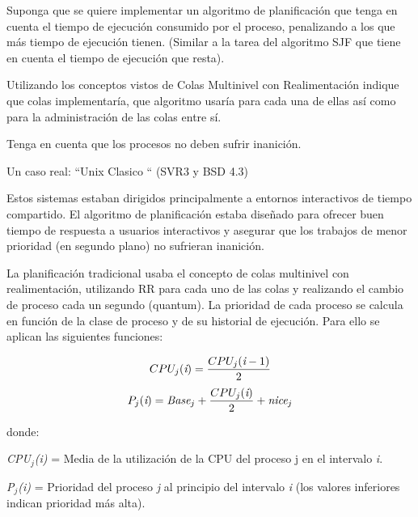 \begin{questions}
\hspace{20pt} Suponga que se quiere implementar un algoritmo de planificación que tenga en cuenta el tiempo de ejecución consumido por el proceso, penalizando a los que más tiempo de ejecución tienen. (Similar a la tarea del algoritmo SJF que tiene en cuenta el
tiempo de ejecución que resta).

\hspace{20pt} Utilizando los conceptos vistos de Colas Multinivel con Realimentación indique que colas implementaría, que algoritmo usaría para cada una de ellas así como para la administración de las colas entre sí.

\hspace{20pt} Tenga en cuenta que los procesos no deben sufrir inanición.

\question Un caso real: “Unix Clasico “ (SVR3 y BSD 4.3)

\hspace{20pt} Estos sistemas estaban dirigidos principalmente a entornos interactivos de tiempo compartido. El algoritmo de planificación estaba diseñado para ofrecer buen tiempo de respuesta a usuarios interactivos y asegurar que los trabajos de menor prioridad (en segundo plano) no sufrieran inanición.

\hspace{20pt} La planificación tradicional usaba el concepto de colas multinivel con realimentación, utilizando RR para cada uno de las colas y realizando el cambio de proceso cada un segundo (quantum). La prioridad de cada proceso se calcula en función de la clase de proceso y de su historial de ejecución. Para ello se aplican las siguientes funciones:

\begin{equation} \label{formula_3}
CPU _{j}(\emph{i}) = \frac{CPU _{j}(\emph{i}-1)}{2}
\end{equation}
\begin{equation} \label{formula_4}
P_{j}(\emph{i}) = \emph{Base}_{j} + \frac{CPU _{j}(\emph{i})}{2} + \emph{nice}_{j}
\end{equation}

donde:

\hspace{20pt} \emph{CPU$_{j}$(i)} = Media de la utilización de la CPU del proceso j en el intervalo \emph{i}.

\hspace{20pt} \emph{P$_{j}$(i)} = Prioridad del proceso \emph{j} al principio del intervalo \emph{i} (los valores inferiores
indican prioridad más alta).


\end{questions}

